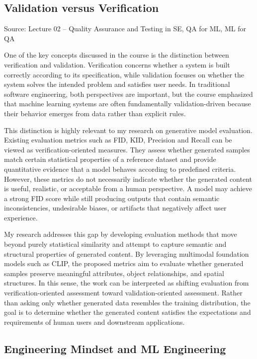 \documentclass{article}
\begin{document}
\subsection{Validation versus Verification}

Source: Lecture 02 -- Quality Assurance and Testing in SE, QA for ML, ML for QA

One of the key concepts discussed in the course is the distinction between verification and validation. Verification concerns whether a system is built correctly according to its specification, while validation focuses on whether the system solves the intended problem and satisfies user needs. In traditional software engineering, both perspectives are important, but the course emphasized that machine learning systems are often fundamentally validation-driven because their behavior emerges from data rather than explicit rules.

This distinction is highly relevant to my research on generative model evaluation. Existing evaluation metrics such as FID\cite{heusel2017gans}, KID\cite{binkowski2018demystifying}, Precision and Recall\cite{sajjadi2018assessing} can be viewed as verification-oriented measures. They assess whether generated samples match certain statistical properties of a reference dataset and provide quantitative evidence that a model behaves according to predefined criteria. However, these metrics do not necessarily indicate whether the generated content is useful, realistic, or acceptable from a human perspective. A model may achieve a strong FID score while still producing outputs that contain semantic inconsistencies, undesirable biases, or artifacts that negatively affect user experience.

My research addresses this gap by developing evaluation methods that move beyond purely statistical similarity and attempt to capture semantic and structural properties of generated content. By leveraging multimodal foundation models such as CLIP\cite{radford2021learning}, the proposed metrics aim to evaluate whether generated samples preserve meaningful attributes, object relationships, and spatial structures. In this sense, the work can be interpreted as shifting evaluation from verification-oriented assessment toward validation-oriented assessment. Rather than asking only whether generated data resembles the training distribution, the goal is to determine whether the generated content satisfies the expectations and requirements of human users and downstream applications.

\subsection{Engineering Mindset and ML Engineering}
\end{document}
